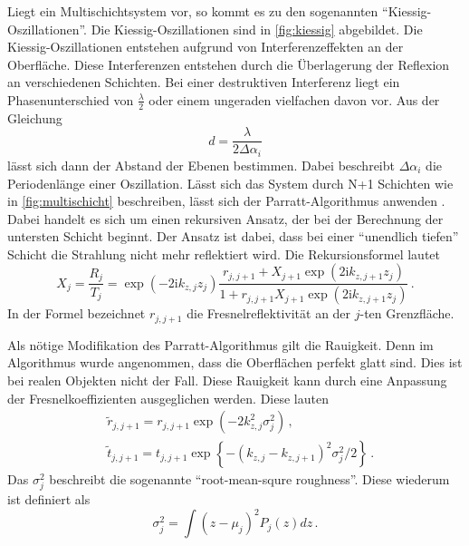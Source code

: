Liegt ein Multischichtsystem vor, so kommt es zu den sogenannten \enquote{Kiessig-Oszillationen}.
Die Kiessig-Oszillationen sind in \autoref{fig:kiessig} abgebildet.
Die Kiessig-Oszillationen entstehen aufgrund von Interferenzeffekten an der Oberfläche.
Diese Interferenzen entstehen durch die Überlagerung der Reflexion an verschiedenen Schichten.
Bei einer destruktiven Interferenz liegt ein Phasenunterschied von $\frac{\lambda}{2}$ oder einem ungeraden vielfachen davon vor.
Aus der Gleichung
\begin{equation}
    d = \frac{\lambda}{2 \Delta \alpha_i}
\end{equation}
lässt sich dann der Abstand der Ebenen bestimmen.
Dabei beschreibt $\Delta \alpha_i$ die Periodenlänge einer Oszillation. 
Lässt sich das System durch N+1 Schichten wie in \autoref{fig:multischicht} beschreiben, lässt sich der Parratt-Algorithmus anwenden \cite{tolan_xray}.
Dabei handelt es sich um einen rekursiven Ansatz, der bei der Berechnung der untersten Schicht beginnt.
Der Ansatz ist dabei, dass bei einer \enquote{unendlich tiefen} Schicht die Strahlung nicht mehr reflektiert wird.
Die Rekursionsformel lautet
\begin{equation}
    X_j=\frac{R_j}{T_j}=\exp \left(-2 \mathrm{i} k_{z, j} z_j\right) \frac{r_{j, j+1}+X_{j+1} \exp \left(2 \mathrm{i} k_{z, j+1} z_j\right)}{1+r_{j, j+1} X_{j+1} \exp \left(2 \mathrm{i} k_{z, j+1} z_j\right)} \, .
\end{equation}
In der Formel bezeichnet $r_{j,j+1}$ die Fresnelreflektivität an der $j$-ten Grenzfläche.

Als nötige Modifikation des Parratt-Algorithmus gilt die Rauigkeit.
Denn im Algorithmus wurde angenommen, dass die Oberflächen perfekt glatt sind.
Dies ist bei realen Objekten nicht der Fall.
Diese Rauigkeit kann durch eine Anpassung der Fresnelkoeffizienten ausgeglichen werden.
Diese lauten
\begin{align}
    & \tilde{r}_{j, j+1}=r_{j, j+1} \exp \left(-2 k_{z, j}^2 \sigma_j^2\right) \, ,\\
    & \tilde{t}_{j, j+1}=t_{j, j+1} \exp \left\{-\left(k_{z, j}-k_{z, j+1}\right)^2 \sigma_j^2 / 2\right\} \, .
\end{align}
Das $\sigma_j^2$ beschreibt die sogenannte \enquote{root-mean-squre roughness}.
Diese wiederum ist definiert als
\begin{equation*}
    \sigma_j^2 = \int (z - \mu_j)^2 P_j (z) dz \, .
\end{equation*}

